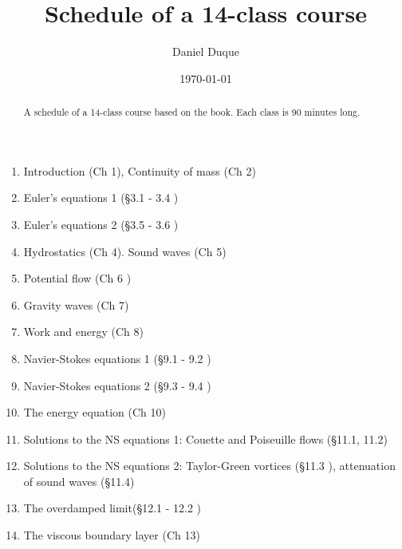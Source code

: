 \documentclass[]{article}
\title{Schedule of a 14-class course}
\author{Daniel Duque}
\date{\today}
\begin{document}
\maketitle

\begin{abstract}

A schedule of a 14-class course based on the
book. Each class is 90 minutes long.
\end{abstract}

\begin{enumerate}
\item Introduction (Ch 1), Continuity of mass (Ch 2)
\item Euler's equations 1 (\S 3.1 - 3.4 )
\item Euler's equations 2 (\S 3.5 - 3.6 )
\item Hydrostatics (Ch 4). Sound waves (Ch 5)
\item Potential flow (Ch 6 )
\item Gravity waves (Ch 7)
\item Work and energy (Ch 8)
\item Navier-Stokes equations 1 (\S 9.1 - 9.2 )
\item Navier-Stokes equations 2 (\S 9.3 - 9.4 )
\item The energy equation (Ch 10)
\item Solutions to the NS equations 1: Couette and Poiseuille flows (\S 11.1, 11.2)
\item Solutions to the NS equations 2: Taylor-Green vortices (\S 11.3 ),
	attenuation of sound waves (\S 11.4)
\item The overdamped limit(\S 12.1 - 12.2 )
\item The viscous boundary layer (Ch 13)

\end{enumerate}
\end{document}
